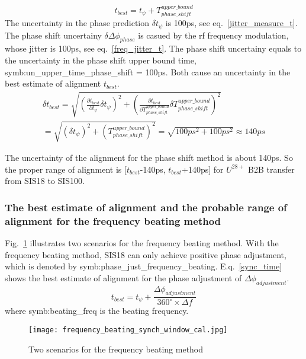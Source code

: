 \begin{equation}
t_{best} = t_{\psi} + T_{phase\_ shift}^{upper\_ bound} \label{Phase_win}
\end{equation}
The uncertainty in the phase prediction $\delta t_{\psi}$ is 100ps, see eq.~\ref{jitter_measure_t}. The phase shift uncertainy $\delta \Delta \phi_{phase}$ is casued by the rf frequency modulation, whose jitter is 100ps, see eq.~\ref{freq_jitter_t}. The phase shift uncertainy equals to the uncertainty in the phase shift upper bound time, \gls{symb:un_upper_time_phase_shift} = 100ps. Both cause an uncertainty in the best estimate of alignment $t_{best}$.
\begin{equation}
\begin{aligned}
\delta t_{best} =\sqrt {(\frac {\partial t_{best}}{\partial t_{\psi}}\delta t_{\psi})^2 + (\frac {\partial t_{best}}{\partial T_{phase\_ shift}^{upper\_ bound}}\delta T_{phase\_ shift}^{upper\_ bound})^2} \\
 =\sqrt {(\delta t_{\psi})^2+(T_{phase\_ shift}^{upper\_ bound})^2} =\sqrt { 100ps^2+100ps^2}\approx 140ps \label{Phase_uncertainty}
\end{aligned}
\end{equation}

The uncertainty of the alignment for the phase shift method is about 140ps. So the proper range of alignment is [$t_{best}$-140ps, $t_{best}$+140ps] for $U^{28+}$ B2B transfer from SIS18 to SIS100.
\subsubsection{The best estimate of alignment and the probable range of alignment for the frequency beating method}
Fig.~\ref{frequency_beating} illustrates two scenarios for the frequency beating method. With the frequency beating method, SIS18 can only achieve positive phase adjustment, which is denoted by \gls{symb:phase_just_frequency_beating}. E.q.~\ref{sync_time} shows the best estimate of alignment for the phase adjustment of $\Delta \phi_{adjustment}$.
\begin{equation}
	 t_{best} = t_{\psi}+\frac {\Delta \phi_{adjustment}}{{360^\circ} \times {\Delta f}} \label {sync_time}
   \end{equation}
where \gls{symb:beating_freq} is the beating frequency.
\begin{figure}[!htb]
   \centering   
   \texttt{[image: frequency\_beating\_synch\_window\_cal.jpg]}
   \caption{Two scenarios for the frequency beating method}
   \label{frequency_beating}
\end{figure}

